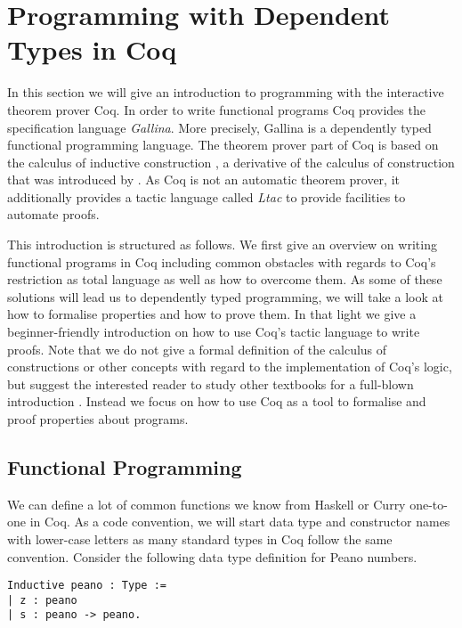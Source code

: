 \section{Programming with Dependent Types in Coq}
\label{sec:progDT}

In this section we will give an introduction to programming with the interactive theorem prover Coq.
In order to write functional programs Coq provides the specification language \emph{Gallina}.
More precisely, Gallina is a dependently typed functional programming language.
The theorem prover part of Coq is based on the calculus of inductive construction \citep{coquand1988inductively}, a derivative of the calculus of construction that was introduced by \citet{coquand1986calculus}.
As Coq is not an automatic theorem prover, it additionally provides a tactic language called \emph{Ltac} to provide facilities to automate proofs.

This introduction is structured as follows.
We first give an overview on writing functional programs in Coq including common obstacles with regards to Coq's restriction as total language as well as how to overcome them.
As some of these solutions will lead us to dependently typed programming, we will take a look at how to formalise properties and how to prove them.
In that light we give a beginner-friendly introduction on how to use Coq's tactic language to write proofs.
Note that we do not give a formal definition of the calculus of constructions or other concepts with regard to the implementation of Coq's logic, but suggest the interested reader to study other textbooks for a full-blown introduction \citep{pierce2010software, chlipala2011certified}.
Instead we focus on how to use Coq as a tool to formalise and proof properties about programs.

\subsection{Functional Programming}

We can define a lot of common functions we know from Haskell or Curry one-to-one in Coq.
As a code convention, we will start data type and constructor names with lower-case letters as many standard types in Coq follow the same convention.
Consider the following data type definition for Peano numbers.

\begin{verbatim}
Inductive peano : Type :=
| z : peano
| s : peano -> peano.
\end{verbatim}

